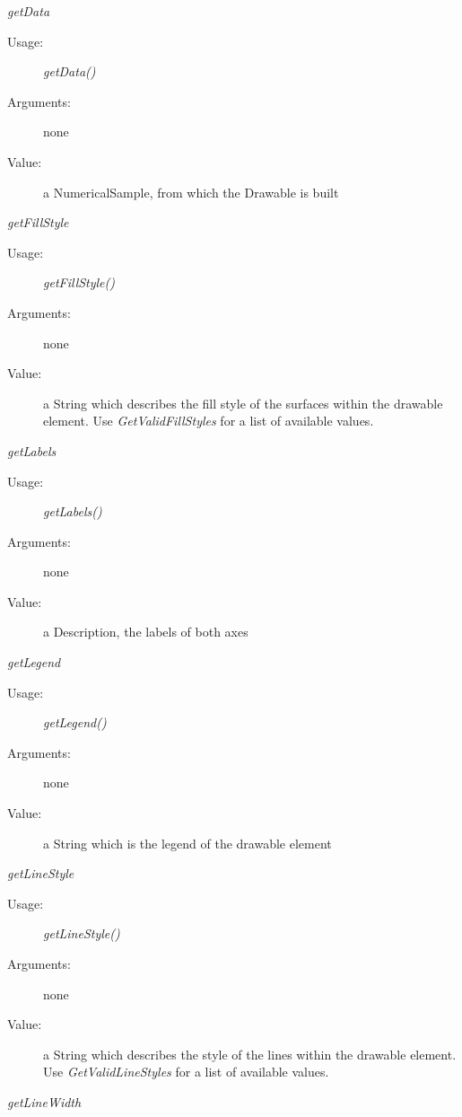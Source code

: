 \begin{description}
\begin{description}
  \item \textit{getData}
    \begin{description}
    \item[Usage:] \textit{getData()}
    \item[Arguments:] none
    \item[Value:] a NumericalSample, from which the Drawable is built
    \end{description}
    \bigskip
  \item \textit{getFillStyle}
    \begin{description}
    \item[Usage:] \textit{getFillStyle()}
    \item[Arguments:] none
    \item[Value:] a String which describes the fill style of the surfaces within the drawable element. Use \textit{GetValidFillStyles} for a list of available values.
    \end{description}
    \bigskip
  \item \textit{getLabels}
    \begin{description}
    \item[Usage:] \textit{getLabels()}
    \item[Arguments:] none
    \item[Value:] a Description, the labels of both axes
    \end{description}
    \bigskip
  \item \textit{getLegend}
    \begin{description}
    \item[Usage:] \textit{getLegend()}
    \item[Arguments:] none
    \item[Value:] a String which is the legend of the drawable element
    \end{description}
    \bigskip
  \item \textit{getLineStyle}
    \begin{description}
    \item[Usage:] \textit{getLineStyle()}
    \item[Arguments:] none
    \item[Value:] a String which describes the  style of the lines within the drawable element. Use \textit{GetValidLineStyles} for a list of available values.
    \end{description}
    \bigskip
  \item \textit{getLineWidth}
    \begin{description}

\end{description}
\end{description}
\end{description}
